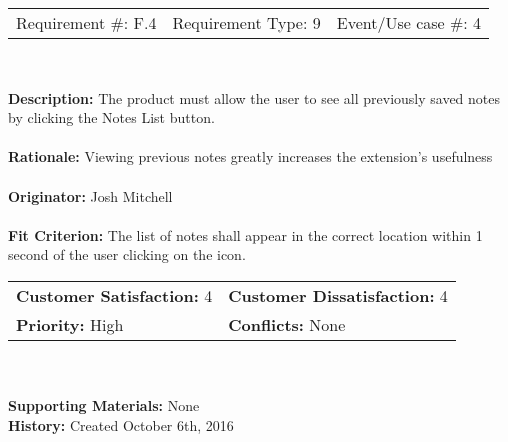 \documentclass[12pt, titlepage]{article}
\begin{document}
\begin{framed}
	
	\begin{center}
		
		\begin{tabular}{ l c r }
			Requirement \#: F.4 & Requirement Type: 9 & Event/Use case \#: 4\\
		\end{tabular} \\
	\end{center}
	\textbf{Description:} The product must allow the user to see all previously 
	saved notes by clicking the Notes List button.\\
	\\
	\textbf{Rationale:} Viewing previous notes greatly increases the 
	extension's usefulness \\
	\\
	\textbf{Originator:} Josh Mitchell \\
	\\
	\textbf{Fit Criterion:} The list of notes shall appear in the correct 
	location within 1 second of the user clicking on the icon. \\
	
	\begin{tabular}{ll}
		\textbf{Customer Satisfaction:} 4 & \textbf{Customer Dissatisfaction:} 
		4 \\
		\textbf{Priority:} High & \textbf{Conflicts:} None\\
	\end{tabular} \\
	\\
	\textbf{Supporting Materials:} None \\
	\textbf{History:} Created October 6th, 2016
	
\end{framed}
\end{document}
